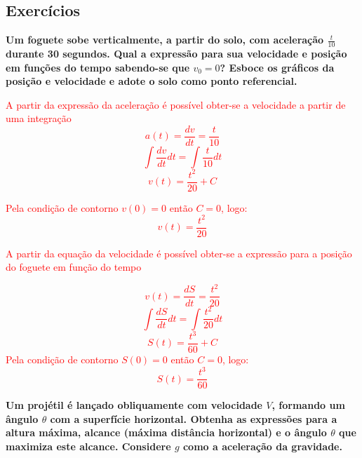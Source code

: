 \documentclass[
    12pt, %
    openright,
    twoside, %
    a4paper, %
    article,
    english,brazil %
]{abntex2}
\begin{document}
\subsection{Exercícios}

\textbf{Um foguete sobe verticalmente, a partir do solo, com aceleração $\frac{t}{10}$ durante 30 segundos. Qual a expressão para sua velocidade e posição em funções do tempo sabendo-se que $v_0 = 0$? Esboce os gráficos da posição e velocidade e adote o solo como ponto referencial.}

\textcolor{red}{A partir da expressão da aceleração é possível obter-se a velocidade a partir de uma integração}
\textcolor{red}{
    $$a(t) = \frac{dv}{dt} = \frac{t}{10}$$
    $$\int \frac{dv}{dt} dt = \int \frac{t}{10} dt $$
    $$v(t) = \frac{t^2}{20} + C $$
}

\textcolor{red}{Pela condição de contorno $v(0) = 0$ então $C = 0$, logo:}
\textcolor{red}{
    $$v(t) = \frac{t^2}{20} $$
}


\textcolor{red}{A partir da equação da velocidade é possível obter-se a expressão para a posição do foguete em função do tempo}

\textcolor{red}{
    $$v(t) = \frac{dS}{dt} = \frac{t^2}{20} $$
    $$\int \frac{dS}{dt} dt = \int \frac{t^2}{20} dt$$
    $$S(t) = \frac{t^3}{60} + C $$
}
\textcolor{red}{Pela condição de contorno $S(0) = 0$ então $C = 0$, logo:}
\textcolor{red}{
    $$S(t) = \frac{t^3}{60} $$
}


\textbf{Um projétil é lançado obliquamente com velocidade $V$, formando um ângulo $\theta$ com a superfície horizontal. Obtenha as expressões para a altura máxima, alcance (máxima distância horizontal) e o ângulo $\theta$ que maximiza este alcance. Considere $g$ como a aceleração da gravidade.}
\end{document}

